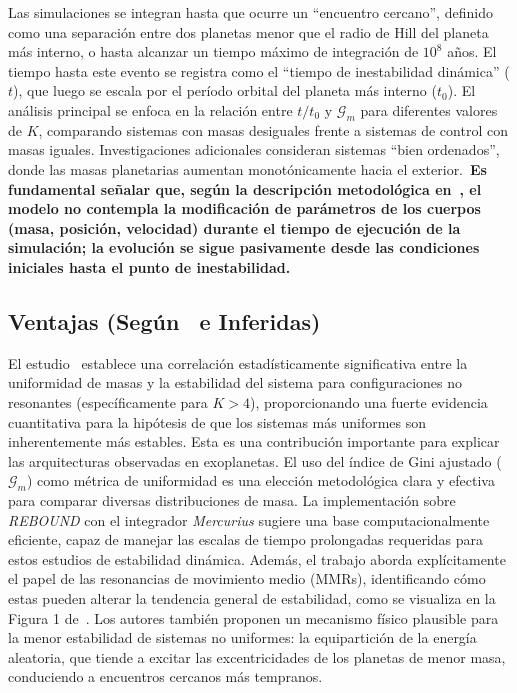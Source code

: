 Las simulaciones se integran hasta que ocurre un ``encuentro cercano'', definido como una separación entre dos planetas menor que el radio de Hill del planeta más interno, o hasta alcanzar un tiempo máximo de integración de $10^8$ años. El tiempo hasta este evento se registra como el ``tiempo de inestabilidad dinámica'' ($t$), que luego se escala por el período orbital del planeta más interno ($t_0$). El análisis principal se enfoca en la relación entre $t/t_0$ y $\mathcal{G}_m$ para diferentes valores de $K$, comparando sistemas con masas desiguales frente a sistemas de control con masas iguales. Investigaciones adicionales consideran sistemas ``bien ordenados'', donde las masas planetarias aumentan monotónicamente hacia el exterior.\ \textbf{Es fundamental señalar que, según la descripción metodológica en~\cite{Wu2025}, el modelo no contempla la modificación de parámetros de los cuerpos (masa, posición, velocidad) durante el tiempo de ejecución de la simulación; la evolución se sigue pasivamente desde las condiciones iniciales hasta el punto de inestabilidad.}

\subsection{Ventajas (Según~\cite{Wu2025} e Inferidas)}
El estudio~\cite{Wu2025} establece una correlación estadísticamente significativa entre la uniformidad de masas y la estabilidad del sistema para configuraciones no resonantes (específicamente para $K > 4$), proporcionando una fuerte evidencia cuantitativa para la hipótesis de que los sistemas más uniformes son inherentemente más estables. Esta es una contribución importante para explicar las arquitecturas observadas en exoplanetas. El uso del índice de Gini ajustado ($\mathcal{G}_m$) como métrica de uniformidad es una elección metodológica clara y efectiva para comparar diversas distribuciones de masa. La implementación sobre \textit{REBOUND} con el integrador \textit{Mercurius} sugiere una base computacionalmente eficiente, capaz de manejar las escalas de tiempo prolongadas requeridas para estos estudios de estabilidad dinámica. Además, el trabajo aborda explícitamente el papel de las resonancias de movimiento medio (MMRs), identificando cómo estas pueden alterar la tendencia general de estabilidad, como se visualiza en la Figura 1 de~\cite{Wu2025}. Los autores también proponen un mecanismo físico plausible para la menor estabilidad de sistemas no uniformes: la equipartición de la energía aleatoria, que tiende a excitar las excentricidades de los planetas de menor masa, conduciendo a encuentros cercanos más tempranos.


